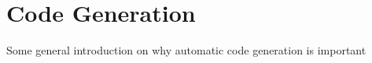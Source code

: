\chapter{Code Generation}\label{ch:code-gen}
Some general introduction on why automatic code generation is important

